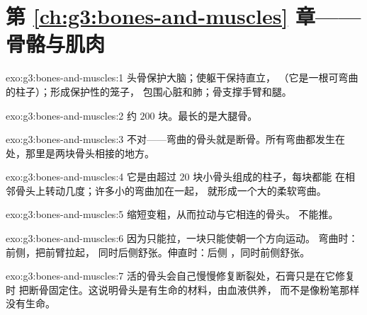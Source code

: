 \section*{第 \ref{ch:g3:bones-and-muscles} 章——骨骼与肌肉}

\begin{solution}{exo:g3:bones-and-muscles:1}
头骨保护大脑；使躯干保持直立，
（它是一根可弯曲的柱子）；形成保护性的笼子，
包围心脏和肺；骨支撑手臂和腿。
\end{solution}

\begin{solution}{exo:g3:bones-and-muscles:2}
约 $200$ 块。最长的是大腿骨。
\end{solution}

\begin{solution}{exo:g3:bones-and-muscles:3}
不对——弯曲的骨头就是断骨。所有弯曲都发生在
处，那里是两块骨头相接的地方。
\end{solution}

\begin{solution}{exo:g3:bones-and-muscles:4}
它是由超过 $20$ 块小骨头组成的柱子，每块都能
在相邻骨头上转动几度；许多小的弯曲加在一起，
就形成一个大的柔软弯曲。
\end{solution}

\begin{solution}{exo:g3:bones-and-muscles:5}
缩短变粗，从而拉动与它相连的骨头。
不能推。
\end{solution}

\begin{solution}{exo:g3:bones-and-muscles:6}
因为只能拉，一块只能使朝一个方向运动。
弯曲时：前侧，把前臂拉起，
同时后侧舒张。伸直时：后侧
，同时前侧舒张。
\end{solution}

\begin{solution}{exo:g3:bones-and-muscles:7}
活的骨头会自己慢慢修复断裂处，石膏只是在它修复时
把断骨固定住。这说明骨头是有生命的材料，由血液供养，
而不是像粉笔那样没有生命。
\end{solution}

